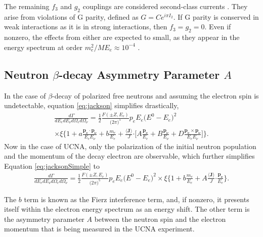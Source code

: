 The remaining $f_3$ and $g_2$ couplings are considered second-class currents \cite{weinberg1958charge}.
They arise from violations of G parity, defined as $G = Ce^{i\pi I_2}$. If G parity is conserved in
weak interactions as it is in strong interactions, then $f_3=g_2=0$. Even if nonzero, the effects
from either are expected to small, as they appear in the energy spectrum at order $m_e^2/ME_e \approx 10^{-4}$
\cite{plaster2012,holstein1974recoil}.


\subsection{Neutron $\beta$-decay Asymmetry Parameter $A$} \label{ssec:neutronAsymmParam}

In the case of $\beta$-decay of polarized free neutrons and assuming the electron spin is undetectable,
equation \ref{eq:jackson} simplifies drastically,
%
\begin{multline}
  \frac{d\Gamma}{dE_e dE_\nu d\Omega_e d\Omega_\nu} = \frac{1}{2} \frac{F(\pm Z, E_e)}{\big( 2\pi \big)^5}
  p_e E_e \big( E^0 - E_e \big)^2 \\ \times \xi 
  \Bigg\{ 1 + a\frac{\boldsymbol{p_e \cdot p_\nu}}{E_e E_\nu} + b\frac{m_e}{E_e} 
  + \frac{\boldsymbol{\langle J \rangle}}{J} \boldsymbol{\cdot} \Bigg[ A\frac{\boldsymbol{p_e}}{E_e}
    + B\frac{\boldsymbol{p_\nu}}{E_\nu} + D\frac{\boldsymbol{p_e \times p_\nu}}{E_e E_\nu}\Bigg]
  \Bigg\}.
  \label{eq:jacksonSimple}
\end{multline}
%
Now in the case of UCNA, only the polarization of the initial neutron population and the momentum
of the decay electron are observable, which further simplifies Equation \ref{eq:jacksonSimple} to
%
\begin{multline}
  \frac{d\Gamma}{dE_e dE_\nu d\Omega_e d\Omega_\nu} = \frac{1}{2} \frac{F(\pm Z, E_e)}{\big( 2\pi \big)^5}
  p_e E_e \big( E^0 - E_e \big)^2 \times \xi 
  \Bigg\{ 1 + b\frac{m_e}{E_e} 
  + A \frac{\boldsymbol{\langle J \rangle}}{J} \boldsymbol{\cdot}\frac{\boldsymbol{p_e}}{E_e}
  \Bigg\}.
  \label{eq:jacksonSimple2}
\end{multline}
%

The $b$ term is known as the Fierz interference term, and, if nonzero, it presents itself
within the electron energy spectrum as an energy shift. The other term is the asymmetry parameter
$A$ between the neutron spin and the electron momentum that is being measured in the UCNA experiment.

